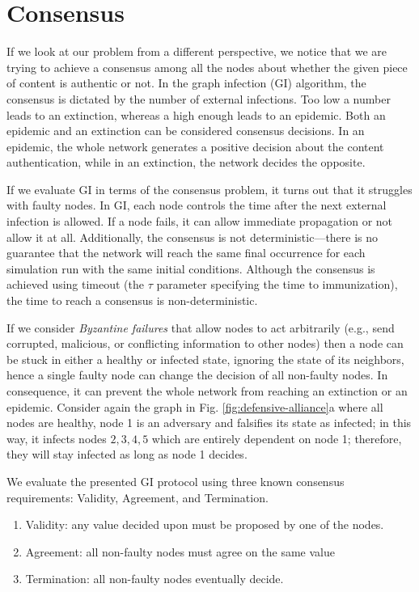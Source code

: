 
\chapter{Consensus}
\label{consensus}
If we look at our problem from a different perspective, we notice that we are trying to achieve a consensus among all the nodes about whether the given piece of content is authentic or not. In the graph infection (GI) algorithm, the consensus is dictated by the number of external infections. Too low a number leads to an extinction, whereas a high enough leads to an epidemic. Both an epidemic and an extinction can be considered consensus decisions. In an epidemic, the whole network generates a positive decision about the content authentication, while in an extinction, the network decides the opposite.

If we evaluate GI in terms of the consensus problem, it turns out that it struggles with faulty nodes. In GI, each node controls the time after the next external infection is allowed. If a node fails, it can allow immediate propagation or not allow it at all. Additionally, the consensus is not deterministic––there is no guarantee that the network will reach the same final occurrence for each simulation run with the same initial conditions. Although the consensus is achieved using timeout (the $\tau$ parameter specifying the time to immunization), the time to reach a consensus is non-deterministic.

If we consider \textit{Byzantine failures}\cite{lamport2019byzantine} that allow nodes to act arbitrarily (e.g., send corrupted, malicious, or conflicting information to other nodes) then a node can be stuck in either a healthy or infected state, ignoring the state of its neighbors, hence a single faulty node can change the decision of all non-faulty nodes. In consequence, it can prevent the whole network from reaching an extinction or an epidemic. Consider again the graph in Fig. \ref{fig:defensive-alliance}a where all nodes are healthy, node 1 is an adversary and falsifies its state as infected; in this way, it infects nodes ${2,3,4,5}$ which are entirely dependent on node 1; therefore, they will stay infected as long as node 1 decides. 

We evaluate the presented GI protocol using three known consensus requirements: Validity, Agreement, and Termination.
\begin{enumerate}
    \item Validity: any value decided upon must be proposed by one of the nodes.
    \item Agreement: all non-faulty nodes must agree on the same value
    \item Termination: all non-faulty nodes eventually decide.
\end{enumerate}

